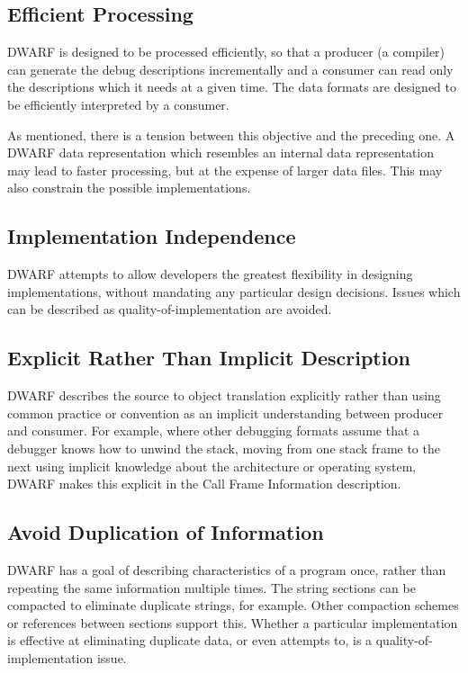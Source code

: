 \subsection{Efficient Processing} 
DWARF is designed to be processed efficiently, so that a 
producer (a compiler) can generate the debug descriptions 
incrementally and a consumer can read only the descriptions 
which it needs at a given time. The data formats are designed 
to be efficiently interpreted by a consumer.

As mentioned, there is a tension between this objective and 
the preceding one.  A DWARF data representation which resembles 
an internal data representation may lead to faster processing, 
but at the expense of larger data files. This may also constrain 
the possible implementations.

\subsection{Implementation Independence}
DWARF attempts to allow developers the greatest flexibility 
in designing implementations, without mandating any particular 
design decisions. Issues which can be described as 
quality-of-implementation are avoided.

\subsection{Explicit Rather Than Implicit Description}
DWARF describes the source to object translation explicitly 
rather than using common practice or convention as an implicit 
understanding between producer and consumer.  For example, where 
other debugging formats assume that a debugger knows how to 
unwind the stack, moving from one stack frame to the next using 
implicit knowledge about the architecture or operating system, 
DWARF makes this explicit in the Call Frame Information description.

\subsection{Avoid Duplication of Information}
DWARF has a goal of describing characteristics of a program once, 
rather than repeating the same information multiple times.  The 
string sections can be compacted to eliminate duplicate strings, 
for example.  Other compaction schemes or references between 
sections support this. Whether a particular implementation is 
effective at eliminating duplicate data, or even attempts to, 
is a quality-of-implementation issue.  

